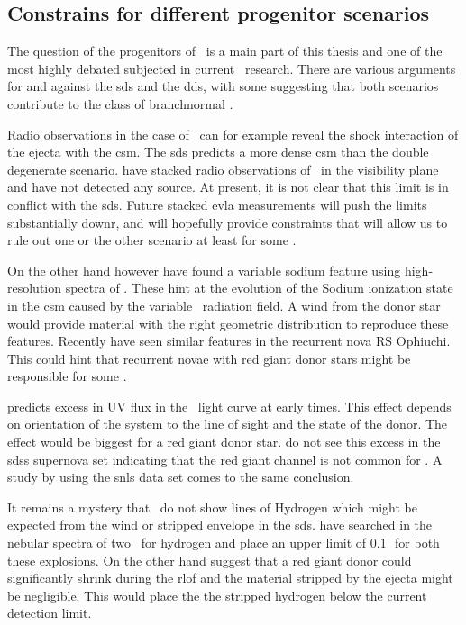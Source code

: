 \subsection{Constrains for different progenitor scenarios}
\label{sec:progenitor_constraints}
The question of the progenitors of \sneia\ is a main part of this thesis and one of the most highly debated subjected in current \sneia\ research. There are various arguments for and against the \gls{sds} and the \gls{dds}, with some suggesting that both scenarios contribute to the class of \gls{branchnormal} \sneia.

Radio observations in the case of \sneia\ can for example reveal the shock interaction of the ejecta with the \gls{csm}. The \gls{sds} predicts a more dense \gls{csm} than the double degenerate scenario. \citet{2011arXiv1105.6188H} have stacked radio observations of \sneia\ in the visibility plane and have not detected any source. At present, it is not clear that this limit is in conflict with the \gls{sds}. Future stacked \gls{evla} measurements will push the limits substantially downr, and will hopefully provide constraints that will allow us to rule out one or the other scenario at least for some \sneia.

On the other hand however \cite{2007Sci...317..924P} have found a variable sodium feature using high-resolution spectra of \sneia. These hint at the evolution of the Sodium ionization state in the \gls{csm} caused by the variable \snia\ radiation field. A wind from the donor star would provide material with the right geometric distribution to reproduce these features. Recently \cite{2011A&A...530A..63P} have seen similar features in the recurrent nova RS Ophiuchi. This could hint that recurrent novae with red giant donor stars might be responsible for some \sneia. 


\cite{2010ApJ...708.1025K} predicts excess in UV flux in the \snia\ light curve at early times. This effect depends on orientation of the system to the line of sight and the state of the donor. The effect would be biggest for a red giant donor star. \cite{2010ApJ...722.1691H} do not see this excess in the \gls{sdss} supernova set indicating that the red giant channel is not common for \sneia. A study by \cite{2011arXiv1106.4008B} using the \gls{snls} data set comes to the same conclusion.

It remains a mystery that \sneia\ do not show lines of Hydrogen which might be expected from the wind or stripped envelope in the \gls{sds}. \citet{2007ApJ...670.1275L} have searched in the nebular spectra of two \sneia\ for hydrogen and place an upper limit of 0.1\,\msun\ for both these explosions. On the other hand \citet{2011ApJ...730L..34J} suggest that a red giant donor could significantly shrink during the \gls{rlof} and the material stripped by the ejecta might be negligible. This would place the the stripped hydrogen below the current detection limit. 



